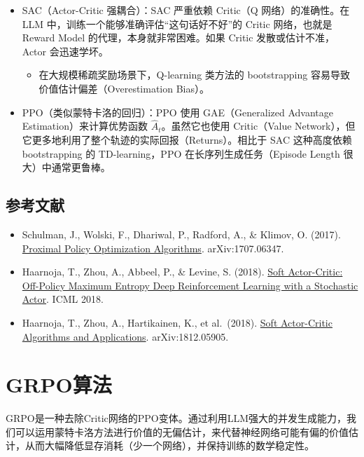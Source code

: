 \begin{itemize}
\tightlist
\item
  SAC（Actor-Critic 强耦合）：SAC 严重依赖 Critic（Q 网络）的准确性。在 LLM 中，训练一个能够准确评估``这句话好不好''的 Critic 网络，也就是 Reward Model 的代理，本身就非常困难。如果 Critic 发散或估计不准，Actor 会迅速学坏。

  \begin{itemize}
  \tightlist
  \item
    在大规模稀疏奖励场景下，Q-learning 类方法的 bootstrapping 容易导致价值估计偏差（Overestimation Bias）。
  \end{itemize}
\item
  PPO（类似蒙特卡洛的回归）：PPO 使用 GAE（Generalized Advantage Estimation）来计算优势函数 \(\hat{A}_t\)。虽然它也使用 Critic（Value Network），但它更多地利用了整个轨迹的实际回报（Returns）。相比于 SAC 这种高度依赖 bootstrapping 的 TD-learning，PPO 在长序列生成任务（Episode Length 很大）中通常更鲁棒。
\end{itemize}

\hypertarget{ux53c2ux8003ux6587ux732e-82}{%
\subsection{参考文献}\label{ux53c2ux8003ux6587ux732e-82}}

\begin{itemize}
\tightlist
\item
  Schulman, J., Wolski, F., Dhariwal, P., Radford, A., \& Klimov, O. (2017). \href{https://arxiv.org/abs/1707.06347}{Proximal Policy Optimization Algorithms}. arXiv:1707.06347.
\item
  Haarnoja, T., Zhou, A., Abbeel, P., \& Levine, S. (2018). \href{https://arxiv.org/abs/1801.01290}{Soft Actor-Critic: Off-Policy Maximum Entropy Deep Reinforcement Learning with a Stochastic Actor}. ICML 2018.
\item
  Haarnoja, T., Zhou, A., Hartikainen, K., et al.~(2018). \href{https://arxiv.org/abs/1812.05905}{Soft Actor-Critic Algorithms and Applications}. arXiv:1812.05905.
\end{itemize}

\clearpage

\hypertarget{grpoux7b97ux6cd5}{%
\section{GRPO算法}\label{grpoux7b97ux6cd5}}

GRPO是一种去除Critic网络的PPO变体。通过利用LLM强大的并发生成能力，我们可以运用蒙特卡洛方法进行价值的无偏估计，来代替神经网络可能有偏的价值估计，从而大幅降低显存消耗（少一个网络），并保持训练的数学稳定性。

